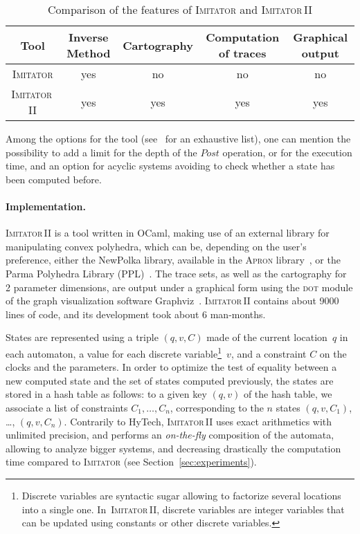 \documentclass[submission,copyright,creativecommons]{eptcs}
\newcommand{\apron}{\textsc{Apron}}
\newcommand{\gdot}{\textsc{dot}}
\newcommand{\graphviz}{Graphviz}
\newcommand{\hytech}{{\sc HyTech}}
\newcommand{\imitator}{\textsc{Imitator}}
\newcommand{\imitatordeux}{\textsc{Imitator}\,II}
\newcommand{\ocaml}{OCaml}
\newcommand{\polka}{NewPolka}
\newcommand{\paragraphe}[1]{\paragraph{#1.}}
\begin{document}
\begin{table}[ht!]
{

\centering
\small

\begin{tabular}{| c || c | c | c | c |}
	\hline
	Tool & Inverse Method & Cartography & Computation of traces & Graphical output \\
	\hline
	\imitator{} & yes & no & no & no \\
	\hline
	\imitatordeux{} & yes & yes & yes & yes \\
	\hline
\end{tabular}

}
\caption{Comparison of the features of \imitator{} and \imitatordeux{}}
\label{table:features}
\end{table}


Among the options for the tool (see~\cite{imitator2_web} for an exhaustive list), one can mention the possibility to add a limit for the depth of the $\mathit{Post}$ operation, or for the execution time, and an option for acyclic systems avoiding to check whether a state has been computed before.




\paragraphe{Implementation}


\imitatordeux{} is a tool written in \ocaml{},
making use of an external library for manipulating convex polyhedra, which can be,
depending on the user's preference, either the \polka{} library, available in the \apron{} library~\cite{jm09}, or the Parma Polyhedra Library (PPL)~\cite{bhz08}.
The trace sets, as well as the cartography for 2 parameter dimensions, are output under a graphical form using the \gdot{} module of the graph visualization software \graphviz{}~\cite{graphviz-web}.
\imitatordeux{} contains about 9000 lines of code, and its development took about 6 man-months.




States are represented using a triple $(q, v, C)$ made of the current location~$q$ in each automaton, a value for each discrete variable\footnote{Discrete variables are syntactic sugar allowing to factorize several locations into a single one. In~\imitatordeux{}, discrete variables are integer variables that can be updated using constants or other discrete variables.}~$v$, and a constraint $C$ on the clocks and the parameters.
In order to optimize the test of equality between a new computed state and the set of states computed previously, the states are stored in a hash table as follows:
to a given key $(q, v)$ of the hash table, we associate a list of constraints $C_1, \dots, C_n$, corresponding to the $n$ states $(q, v, C_1)$, \dots, $(q, v, C_n)$.
Contrarily to \hytech{},
\imitatordeux{} uses exact arithmetics with unlimited precision,
and performs an \emph{on-the-fly} composition of the automata,
allowing to analyze bigger systems, and decreasing drastically the computation time compared to \imitator{} (see Section~\ref{sec:experiments}).
\end{document}
